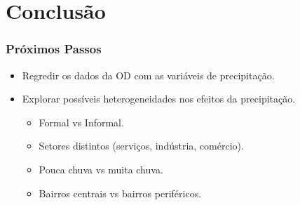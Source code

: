 \section{Conclusão}
\begin{frame}
    \frametitle{Próximos Passos}
    \begin{itemize}
        \item Regredir os dados da OD com as variáveis de precipitação.
        \item Explorar possíveis heterogeneidades nos efeitos da precipitação.
        \begin{itemize}
            \item Formal vs Informal.
            \item Setores distintos (serviços, indústria, comércio).
            \item Pouca chuva vs muita chuva.
            \item Bairros centrais vs bairros periféricos.
        \end{itemize}
    \end{itemize}
\end{frame}